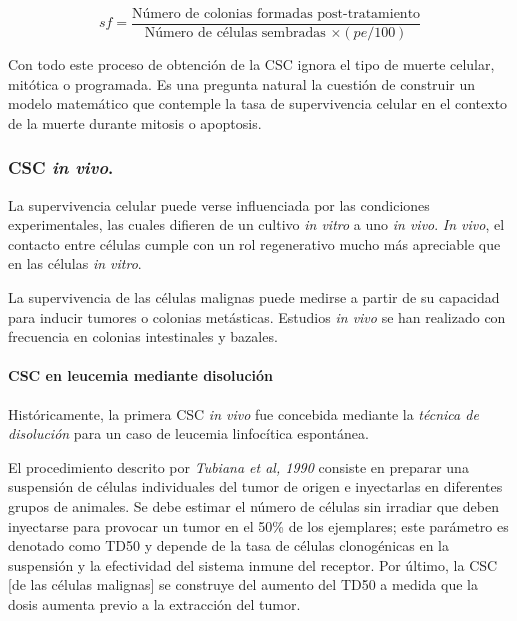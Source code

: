 \documentclass[12pt,letterpaper, oneside]{book}
\begin{document}
				\begin{equation}
				sf=\frac{\textrm{Número de colonias formadas post-tratamiento}}{\textrm{Número de células sembradas $\times (pe/100)$}}
				\end{equation}
				
				Con todo este proceso de obtención de la CSC ignora el tipo de muerte celular, mitótica o programada\cite{Hall.2000}. Es una pregunta natural la cuestión de construir un modelo matemático que contemple la tasa de supervivencia celular en el contexto de la muerte durante mitosis o apoptosis. 
				
				\subsubsection{CSC \textit{in vivo}.}
				La supervivencia celular puede verse influenciada por las condiciones experimentales, las cuales difieren de un cultivo \textit{in vitro} a uno \textit{in vivo}\cite{Tubiana.1990}. \textit{In vivo}, el contacto entre células cumple con un rol regenerativo mucho más apreciable que en las células \textit{in vitro}\cite{Tubiana.1990}. 
				
				La supervivencia de las células malignas puede medirse a partir de su capacidad para inducir tumores o colonias metásticas\cite{Tubiana.1990}. Estudios \textit{in vivo} se han realizado con frecuencia en colonias intestinales y bazales\cite{Tubiana.1990}. 
				
				\paragraph{CSC en leucemia mediante disolución \newline}
				Históricamente, la primera CSC \textit{in vivo} fue concebida mediante la \textit{técnica de disolución} para un caso de leucemia linfocítica espontánea\cite{Tubiana.1990}. 
				
				El procedimiento descrito por \textit{Tubiana et al, 1990} consiste en preparar una suspensión de células individuales del tumor de origen e inyectarlas en diferentes grupos de animales. Se debe estimar el número de células sin irradiar que deben inyectarse para provocar un tumor en el 50\% de los ejemplares; este parámetro es denotado como TD50 y depende de la tasa de células clonogénicas en la suspensión y la efectividad del sistema inmune del receptor. Por último, la CSC [de las células malignas] se construye del aumento del TD50 a medida que la dosis aumenta previo a la extracción del tumor.   
				
\end{document}
